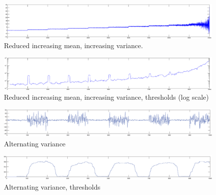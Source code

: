 \begin{figure}
\centering
  \includegraphics[width=1\textwidth]{./Figures/notes/camci_reduced_increasing_mean_increasing_variance.eps}
  \caption[Reduced increasing mean, increasing variance]{Reduced increasing mean, increasing variance.}
  \label{fig:camci_reduced_increasing_mean_increasing_variance}
\end{figure}

\begin{figure}
\centering
  \includegraphics[width=1\textwidth]{./Figures/notes/camci_reduced_increasing_mean_increasing_variance_thresholds.eps}
  \caption[Reduced increasing mean, increasing variance, thresholds]{Reduced increasing mean, increasing variance, thresholds (log scale)}
  \label{fig:camci_reduced_increasing_mean_increasing_variance_thresholds}
\end{figure}


\begin{figure}
\centering
  \includegraphics[width=1\textwidth]{./Figures/notes/camci_takeuchi_alternating_variance.eps}
  \caption[Alternating variance]{Alternating variance}
  \label{fig:camci_takeuchi_alternating_variance}
\end{figure}

\begin{figure}
\centering
  \includegraphics[width=1\textwidth]{./Figures/notes/camci_takeuchi_alternating_variance_thresholds.eps}
  \caption[Alternating variance, thresholds]{Alternating variance, thresholds}
  \label{fig:camci_takeuchi_alternating_variance_thresholds}
\end{figure}